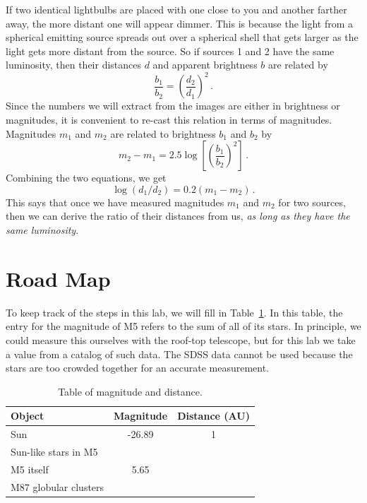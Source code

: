 If two identical lightbulbs are placed with one close to you and another farther away, the more distant one will appear dimmer. This is because the light from a spherical emitting source spreads out over a spherical shell that gets larger as the light gets more distant from the source. So if sources 1 and 2 have the same luminosity, then their distances $d$ and apparent brightness
$b$ are related by
\begin{equation}
\frac{b_1}{b_2} = \left( \frac{d_2}{d_1} \right)^2 \,.
\end{equation}
Since the numbers we will extract from the images are either in brightness or magnitudes,
it is convenient to re-cast this relation in terms of magnitudes. Magnitudes $m_1$ and $m_2$ are
related to brightness $b_1$ and $b_2$ by
\begin{equation}
m_2 - m_1 = 2.5 \log \left[ \left( \frac{b_1}{b_2} \right)^2 \right] \,.
\end{equation}
Combining the two equations, we get
\begin{equation}\label{gc:eq:m-d}
 \log(d_1/d_2) = 0.2 (m_1-m_2) \,.
\end{equation}
This says that once we have measured magnitudes $m_1$ and $m_2$ for two sources, then we can
derive the ratio of their distances from us, \textit{as long as they have the same luminosity}.

\section{Road Map}

To keep track of the steps in this lab, we will fill in Table~\ref{gc:tab:mag}. In this table, the entry for the magnitude of M5 refers to the sum of all of its stars. In
principle, we could measure this ourselves with the roof-top telescope, but for this lab we take
a value from a catalog of such data. The SDSS data cannot be used because the stars
are too crowded together for an accurate measurement.

\begin{table}
	\centering
	\begin{tabular}{l|c|c}
		\toprule
		\textbf{Object} & \textbf{Magnitude} & \textbf{Distance (AU)} \\ \midrule
		Sun & -26.89 & 1 \\\midrule
		Sun-like stars in M5 &  & \\\midrule
		M5 itself & 5.65 & \\\midrule
		M87 globular clusters & &
		\\ \bottomrule
	\end{tabular}
	\caption{Table of magnitude and distance.}\label{gc:tab:mag}
\end{table}

